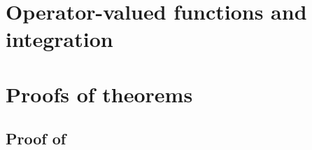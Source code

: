 \chapter{Operator-valued functions and integration}
\label{ch:operator-valued_functions_and_integration}

\chapter{Proofs of theorems}
\label{ch:proof_of_theorems}
\section{Proof of }